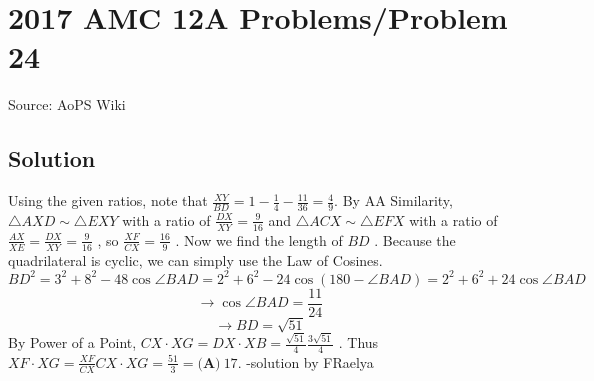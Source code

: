 \documentclass[12pt]{article}
\begin{document}
\section*{{2017 AMC 12A Problems/Problem 24}}
Source: AoPS Wiki

\subsection*{Solution}
Using the given ratios, note that $\frac{XY}{BD} = 1 - \frac{1}{4} - \frac{11}{36} = \frac{4}{9}.$ By AA Similarity, $\triangle AXD \sim \triangle EXY$ with a ratio of $\frac{DX}{XY} = \frac{9}{16}$ and $\triangle ACX \sim \triangle EFX$ with a ratio of $\frac{AX}{XE} = \frac{DX}{XY} = \frac{9}{16}$ , so $\frac{XF}{CX} = \frac{16}{9}$ . Now we find the length of $BD$ . Because the quadrilateral is cyclic, we can simply use the Law of Cosines. \[BD^2=3^2+8^2-48\cos\angle BAD=2^2+6^2-24\cos (180-\angle BAD)=2^2+6^2+24\cos\angle BAD\] \[\rightarrow \cos\angle BAD = \frac{11}{24}\] \[\rightarrow BD=\sqrt{51}\] By Power of a Point, $CX\cdot XG = DX\cdot XB = \frac{\sqrt{51}}{4} \frac{3\sqrt{51}}{4}$ . Thus $XF\cdot XG = \frac{XF}{CX} CX\cdot XG = \frac{51}{3} = \boxed{\textbf{(A)}\ 17}.$ -solution by FRaelya
\end{document}
